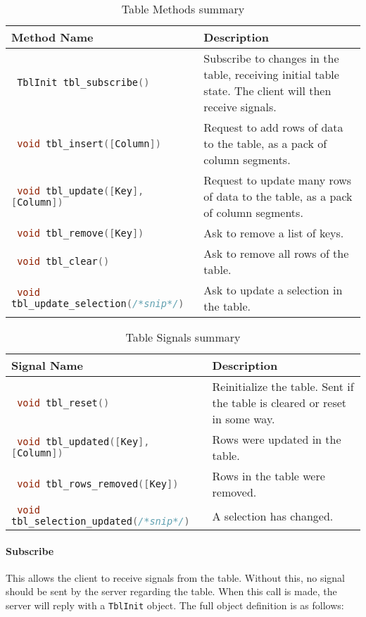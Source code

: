 \documentclass[11pt, oneside]{amsart}
\begin{document}
\begin{table}
	\begin{tabularx}{.9\textwidth}{p{2.5in}X}
		\toprule
		Method Name & Description \\
		\midrule
		\lstinline[language=c++]| TblInit tbl_subscribe() |
		&
		Subscribe to changes in the table, receiving initial table state. The client will then receive signals.
		\\
		\lstinline[language=c++]| void tbl_insert([Column]) |
		&
		Request to add rows of data to the table, as a pack of column segments.
		\\
        \lstinline[language=c++]| void tbl_update([Key], [Column]) |
        &
        Request to update many rows of data to the table, as a pack of column segments.
        \\
		\lstinline[language=c++]| void tbl_remove([Key]) |
		&
		Ask to remove a list of keys.
		\\
		\lstinline[language=c++]| void tbl_clear() |
		&
		Ask to remove all rows of the table.
		\\
		\lstinline[language=c++]| void tbl_update_selection(/*snip*/) |
		&
		Ask to update a selection in the table.
		\\
		\bottomrule
	\end{tabularx}
	\caption{Table Methods summary}
	\label{tbl:table_methods}
\end{table}

\begin{table}
	\begin{tabularx}{.9\textwidth}{p{2.5in}X}
		\toprule
		Signal Name & Description \\
		\midrule
		\lstinline[language=c++]| void tbl_reset() |
		&
		Reinitialize the table. Sent if the table is cleared or reset in some way.
		\\
		\lstinline[language=c++]| void tbl_updated([Key], [Column]) |
		&
		Rows were updated in the table.
		\\
		\lstinline[language=c++]| void tbl_rows_removed([Key]) |
		&
		Rows in the table were removed.
		\\
		\lstinline[language=c++]| void tbl_selection_updated(/*snip*/) |
		&
		A selection has changed.
		\\
		\bottomrule
	\end{tabularx}
	\caption{Table Signals summary}
	\label{tbl:table_signals}
\end{table}

\paragraph{\textbf{Subscribe}} This allows the client to receive signals from the table. Without this, no signal should be sent by the server regarding the table. When this call is made, the server will reply with a \texttt{TblInit} object. The full object definition is as follows:
\end{document}
